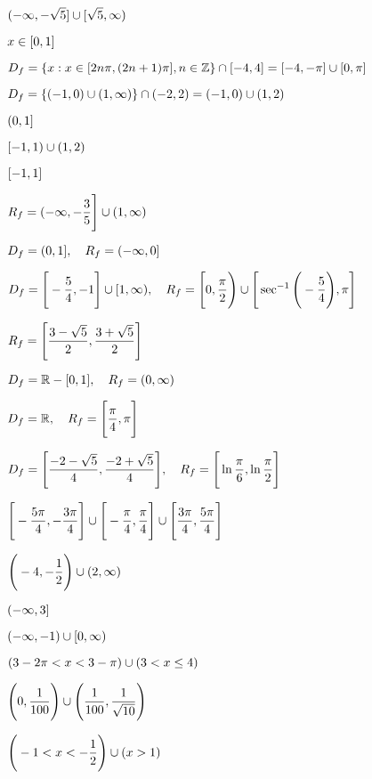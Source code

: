 \documentclass[addpoints]{exam}
\begin{document}
\begin{questions}

\question $\mathlarger{(-\infty, -\sqrt{5}]\cup [ \sqrt{5}, \infty)}$

\question $\mathlarger{x\in [0,1]}$

\question $\mathlarger{D_{f} = \{x: x\in [2n\pi, (2n+1)\pi], n\in \mathbb{Z} \}\cap [-4,4] = [-4,-\pi]\cup [0,\pi] }$

\question $\mathlarger{D_{f}=\{(-1,0)\cup(1,\infty)\}\cap (-2,2) =(-1,0)\cup (1,2)}$

\question $\mathlarger{(0,1]}$

\question $\mathlarger{[-1,1)\cup (1,2)}$

\question $\mathlarger{[-1,1]}$

\question $\mathlarger{R_{f}=(-\infty, -\dfrac{3}{5}\Bigg] \cup (1,\infty)}$

\question $\mathlarger{D_{f} = (0,1],\quad R_{f} = (-\infty, 0]}$

\question $\mathlarger{D_{f} = \Bigg[-\dfrac{5}{4}, -1 \Bigg] \cup [1,\infty),\quad R_{f} = \Bigg[ 0,\dfrac{\pi}{2}\Bigg) \cup \Bigg[\sec^{-1}\Bigg(-\dfrac{5}{4}\Bigg),\pi\Bigg]}$

\question $\mathlarger{R_{f}= \Bigg[\dfrac{3-\sqrt{5}}{2}, \dfrac{3+\sqrt{5}}{2} \Bigg]}$

\question $\mathlarger{D_{f} = \mathbb{R}-[0,1],\quad R_{f} = (0,\infty)}$

\question $\mathlarger{D_{f} = \mathbb{R},\quad R_{f} = \Bigg[\dfrac{\pi}{4}, \pi\Bigg]}$

\question $\mathlarger{D_{f} = \Bigg[ \dfrac{-2-\sqrt{5}}{4}, \dfrac{-2+\sqrt{5}}{4}\Bigg],\quad R_{f} = \Bigg[\ln\dfrac{\pi}{6}, \ln\dfrac{\pi}{2}  \Bigg]}$

\question $\mathlarger{\Bigg[-\dfrac{5\pi}{4}, -\dfrac{3\pi}{4} \Bigg]\cup \Bigg[-\dfrac{\pi}{4}, \dfrac{\pi}{4} \Bigg]\cup \Bigg[\dfrac{3\pi}{4}, \dfrac{5\pi}{4} \Bigg]}$

\question $\mathlarger{\Bigg(-4,-\dfrac{1}{2}\Bigg)\cup (2,\infty)}$

\question $\mathlarger{(-\infty, 3]}$

\question $\mathlarger{(-\infty, -1)\cup [0,\infty)}$

\question $\mathlarger{(3-2\pi<x<3-\pi)\cup (3<x\le 4)}$

\question $\mathlarger{\Bigg( 0,\dfrac{1}{100}\Bigg)\cup \Bigg(\dfrac{1}{100}, \dfrac{1}{\sqrt{10}}\Bigg)}$

\question $\mathlarger{\Bigg(-1<x<-\dfrac{1}{2}\Bigg)\cup(x>1)}$


\end{questions}
\end{document}
